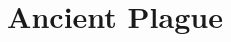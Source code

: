 \documentclass[11pt]{article}
\begin{document}
\ttfamily
\title{Ancient Plague}
\maketitle
\end{document}
